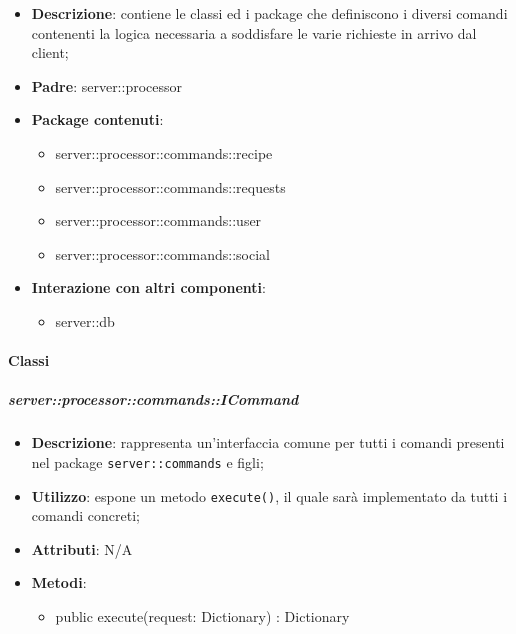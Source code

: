     \begin{itemize}
      \item \textbf{Descrizione}: contiene le classi ed i package che definiscono i diversi comandi contenenti la logica necessaria a soddisfare le varie richieste in arrivo dal client;
      \item \textbf{Padre}: server::processor
      \item \textbf{Package contenuti}:
        \begin{itemize}
          \item server::processor::commands::recipe
          \item server::processor::commands::requests
          \item server::processor::commands::user
          \item server::processor::commands::social
        \end{itemize}
      \item \textbf{Interazione con altri componenti}:
        \begin{itemize}
          \item server::db
        \end{itemize}
    \end{itemize}

      \paragraph{Classi} %

      \subparagraph{server::processor::commands::ICommand} %
      \label{subp:bdsm_app_server_processor_commands_icommand}
      \begin{itemize}
        \item \textbf{Descrizione}: rappresenta un'interfaccia comune per tutti i comandi presenti nel package \texttt{server::commands} e figli;
        \item \textbf{Utilizzo}: espone un metodo \texttt{execute()}, il quale sarà implementato da tutti i comandi concreti;
		\item \textbf{Attributi}: N/A
		\item \textbf{Metodi}:
        	\begin{itemize}
          		\item public execute(request: Dictionary) : Dictionary
        	\end{itemize}
      \end{itemize}


